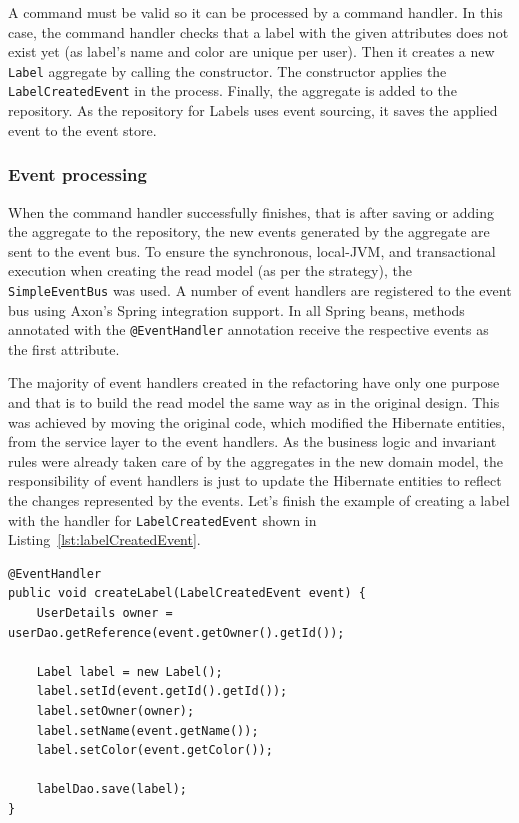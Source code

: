 \documentclass{book}
\begin{document}
A command must be valid so it can be processed by a command handler. In
this case, the command handler checks that a label with the given
attributes does not exist yet (as label's name and color are unique per
user). Then it creates a new \texttt{Label} aggregate by calling the
constructor. The constructor applies the \texttt{LabelCreatedEvent} in
the process. Finally, the aggregate is added to the repository. As the
repository for Labels uses event sourcing, it saves the applied event to
the event store.


\subsubsection{Event processing}\label{event-processing}

When the command handler successfully finishes, that is after saving or
adding the aggregate to the repository, the new events generated by the
aggregate are sent to the event bus. To ensure the synchronous,
local-JVM, and transactional execution when creating the read model (as
per the strategy), the \texttt{SimpleEventBus} was used. A number of
event handlers are registered to the event bus using Axon's Spring
integration support. In all Spring beans, methods annotated with the
\texttt{@EventHandler} annotation receive the respective events as the
first attribute.

The majority of event handlers created in the refactoring have only one
purpose and that is to build the read model the same way as in the
original design. This was achieved by moving the original code, which
modified the Hibernate entities, from the service layer to the event
handlers. As the business logic and invariant rules were already taken
care of by the aggregates in the new domain model, the responsibility of
event handlers is just to update the Hibernate entities to reflect the
changes represented by the events. Let's finish the example of creating
a label with the handler for \texttt{LabelCreatedEvent} shown in Listing~\ref{lst:labelCreatedEvent}.

\begin{lstlisting}[caption={The event handler (listener) for \texttt{LabelCreatedEvent}},label={lst:labelCreatedEvent},captionpos=b,float,floatplacement=H]
@EventHandler
public void createLabel(LabelCreatedEvent event) {
    UserDetails owner = userDao.getReference(event.getOwner().getId());

    Label label = new Label();
    label.setId(event.getId().getId());
    label.setOwner(owner);
    label.setName(event.getName());
    label.setColor(event.getColor());

    labelDao.save(label);
}
\end{lstlisting}
\end{document}
